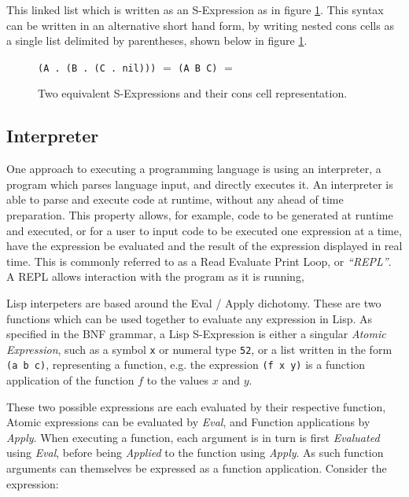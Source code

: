 \documentclass[10pt]{report}
\begin{document}
This linked list which is written as an S-Expression as in figure \ref{fig:conslist}. This syntax can be written in an alternative short hand form, by writing nested cons cells as a single list delimited by parentheses, shown below in figure \ref{fig:conslist}.

\begin{figure}[h]
  \centering
  \texttt{(A . (B . (C . nil)))}
  $=$
  \texttt{(A B C)}
  $=$
  \caption{Two equivalent S-Expressions and their cons cell representation.}
  \label{fig:conslist}
\end{figure}

\subsection{Interpreter} \label{sec:designinterpreter}
One approach to executing a programming language is using an interpreter, a program which parses language input, and directly executes it. An interpreter is able to parse and execute code at runtime, without any ahead of time preparation. This property allows, for example, code to be generated at runtime and executed, or for a user to input code to be executed one expression at a time, have the expression be evaluated and the result of the expression displayed in real time. This is commonly referred to as a Read Evaluate Print Loop, or \textit{``REPL''}. A REPL allows interaction with the program as it is running,  

Lisp interpeters are based around the Eval / Apply dichotomy. These are two functions which can be used together to evaluate any expression in Lisp. As specified in the BNF grammar, a Lisp S-Expression is either a singular \textit{Atomic Expression}, such as a symbol \texttt{x} or numeral type \texttt{52}, or a list written in the form \texttt{(a b c)}, representing a function, e.g. the expression \texttt{(f x y)} is a function application of the function $f$ to the values $x$ and $y$.

These two possible expressions are each evaluated by their respective function, Atomic expressions can be evaluated by \textit{Eval}, and Function applications by \textit{Apply}. When executing a function, each argument is in turn is first \textit{Evaluated} using \textit{Eval}, before being \textit{Applied} to the function using \textit{Apply}. As such function arguments can themselves be expressed as a function application. Consider the expression:
\end{document}
